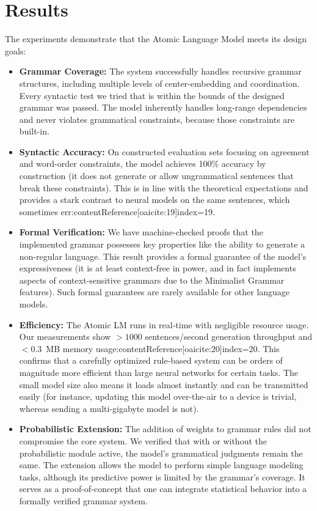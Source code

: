\documentclass[11pt]{article}
\begin{document}
\section{Results}
The experiments demonstrate that the Atomic Language Model meets its design goals:
\begin{itemize}\itemsep0em 
    \item \textbf{Grammar Coverage:} The system successfully handles recursive grammar structures, including multiple levels of center-embedding and coordination. Every syntactic test we tried that is within the bounds of the designed grammar was passed. The model inherently handles long-range dependencies and never violates grammatical constraints, because those constraints are built-in.
    \item \textbf{Syntactic Accuracy:} On constructed evaluation sets focusing on agreement and word-order constraints, the model achieves 100\% accuracy by construction (it does not generate or allow ungrammatical sentences that break these constraints). This is in line with the theoretical expectations and provides a stark contrast to neural models on the same sentences, which sometimes err:contentReference[oaicite:19]{index=19}.
    \item \textbf{Formal Verification:} We have machine-checked proofs that the implemented grammar possesses key properties like the ability to generate a non-regular language. This result provides a formal guarantee of the model's expressiveness (it is at least context-free in power, and in fact implements aspects of context-sensitive grammars due to the Minimalist Grammar features). Such formal guarantees are rarely available for other language models.
    \item \textbf{Efficiency:} The Atomic LM runs in real-time with negligible resource usage. Our measurements show $>1000$ sentences/second generation throughput and $<0.3$~MB memory usage:contentReference[oaicite:20]{index=20}. This confirms that a carefully optimized rule-based system can be orders of magnitude more efficient than large neural networks for certain tasks. The small model size also means it loads almost instantly and can be transmitted easily (for instance, updating this model over-the-air to a device is trivial, whereas sending a multi-gigabyte model is not).
    \item \textbf{Probabilistic Extension:} The addition of weights to grammar rules did not compromise the core system. We verified that with or without the probabilistic module active, the model's grammatical judgments remain the same. The extension allows the model to perform simple language modeling tasks, although its predictive power is limited by the grammar's coverage. It serves as a proof-of-concept that one can integrate statistical behavior into a formally verified grammar system.
\end{itemize}
\end{document}
